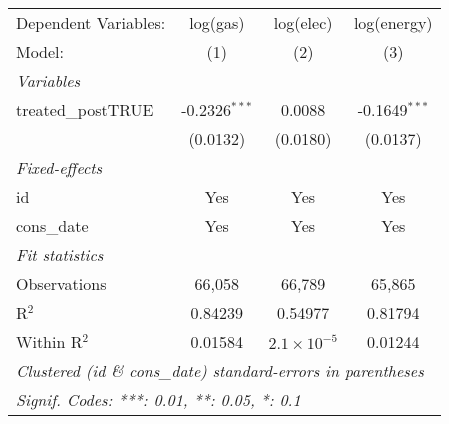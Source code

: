 
\begingroup
\centering
\begin{tabular}{lccc}
   \tabularnewline \midrule \midrule
   Dependent Variables: & log(gas)        & log(elec)            & log(energy)\\  
   Model:               & (1)             & (2)                  & (3)\\  
   \midrule
   \emph{Variables}\\
   treated\_postTRUE    & -0.2326$^{***}$ & 0.0088               & -0.1649$^{***}$\\   
                        & (0.0132)        & (0.0180)             & (0.0137)\\   
   \midrule
   \emph{Fixed-effects}\\
   id                   & Yes             & Yes                  & Yes\\  
   cons\_date           & Yes             & Yes                  & Yes\\  
   \midrule
   \emph{Fit statistics}\\
   Observations         & 66,058          & 66,789               & 65,865\\  
   R$^2$                & 0.84239         & 0.54977              & 0.81794\\  
   Within R$^2$         & 0.01584         & $2.1\times 10^{-5}$  & 0.01244\\  
   \midrule \midrule
   \multicolumn{4}{l}{\emph{Clustered (id \& cons\_date) standard-errors in parentheses}}\\
   \multicolumn{4}{l}{\emph{Signif. Codes: ***: 0.01, **: 0.05, *: 0.1}}\\
\end{tabular}
\par\endgroup


